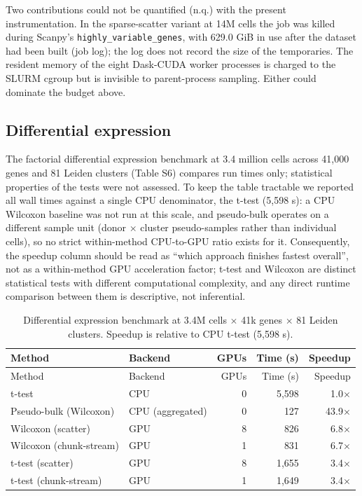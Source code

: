 \documentclass[runningheads]{llncs}
\begin{document}
Two contributions could not be quantified (n.q.) with the present instrumentation. In the sparse-scatter variant at 14M cells the job was killed during Scanpy's \texttt{highly\_\allowbreak{}variable\_\allowbreak{}genes}, with 629.0 GiB in use after the dataset had been built (job log); the log does not record the size of the temporaries. The resident memory of the eight Dask-CUDA worker processes is charged to the SLURM cgroup but is invisible to parent-process sampling. Either could dominate the budget above.

\hypertarget{differential-expression}{%
\subsection{Differential expression}\label{differential-expression}}

The factorial differential expression benchmark at 3.4 million cells across 41,000 genes and 81 Leiden clusters (Table S6) compares run times only; statistical properties of the tests were not assessed. To keep the table tractable we reported all wall times against a single CPU denominator, the t-test (5,598 s): a CPU Wilcoxon baseline was not run at this scale, and pseudo-bulk operates on a different sample unit (donor $\times$ cluster pseudo-samples rather than individual cells), so no strict within-method CPU-to-GPU ratio exists for it. Consequently, the speedup column should be read as ``which approach finishes fastest overall'', not as a within-method GPU acceleration factor; t-test and Wilcoxon are distinct statistical tests with different computational complexity, and any direct runtime comparison between them is descriptive, not inferential.

{\footnotesize\setlength{\tabcolsep}{2pt}
\begin{longtable}[]{@{}llrrr@{}}
\caption{\label{tab:S6}Differential expression benchmark at 3.4M cells $\times$ 41k genes $\times$ 81 Leiden clusters. Speedup is relative to CPU t-test (5,598 s).}\tabularnewline
\toprule\noalign{}
Method & Backend & GPUs & Time (s) & Speedup \\
\midrule\noalign{}
\endfirsthead
\toprule\noalign{}
Method & Backend & GPUs & Time (s) & Speedup \\
\midrule\noalign{}
\endhead
\bottomrule\noalign{}
\endlastfoot
t-test & CPU & 0 & 5,598 & 1.0$\times$ \\
Pseudo-bulk (Wilcoxon) & CPU (aggregated) & 0 & 127 & 43.9$\times$ \\
Wilcoxon (scatter) & GPU & 8 & 826 & 6.8$\times$ \\
Wilcoxon (chunk-stream) & GPU & 1 & 831 & 6.7$\times$ \\
t-test (scatter) & GPU & 8 & 1,655 & 3.4$\times$ \\
t-test (chunk-stream) & GPU & 1 & 1,649 & 3.4$\times$ \\
\end{longtable}
}
\end{document}
